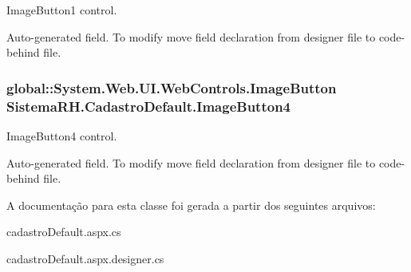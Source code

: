 ImageButton1 control. 

Auto-\/generated field. To modify move field declaration from designer file to code-\/behind file. \hypertarget{class_sistema_r_h_1_1_cadastro_default_ad1e70ae28bfd2bbe912fddb7827823cc}{
\subsubsection[{ImageButton4}]{\setlength{\rightskip}{0pt plus 5cm}global::System.Web.UI.WebControls.ImageButton {\bf SistemaRH.CadastroDefault.ImageButton4}}}
\label{class_sistema_r_h_1_1_cadastro_default_ad1e70ae28bfd2bbe912fddb7827823cc}


ImageButton4 control. 

Auto-\/generated field. To modify move field declaration from designer file to code-\/behind file. 

A documentação para esta classe foi gerada a partir dos seguintes arquivos:\begin{DoxyCompactItemize}
\item 
cadastroDefault.aspx.cs\item 
cadastroDefault.aspx.designer.cs\end{DoxyCompactItemize}
